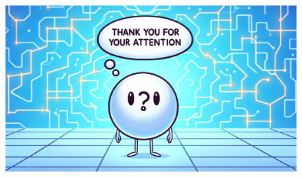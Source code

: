 \documentclass[8pt, xcolor={svgnames}, hyperref={linkcolor=black}]{beamer}
\begin{document}
\begin{frame}
\begin{figure}
    \includegraphics[width=1\textwidth]{figures/thank.png}%
\end{figure}
\end{frame}
\end{document}
